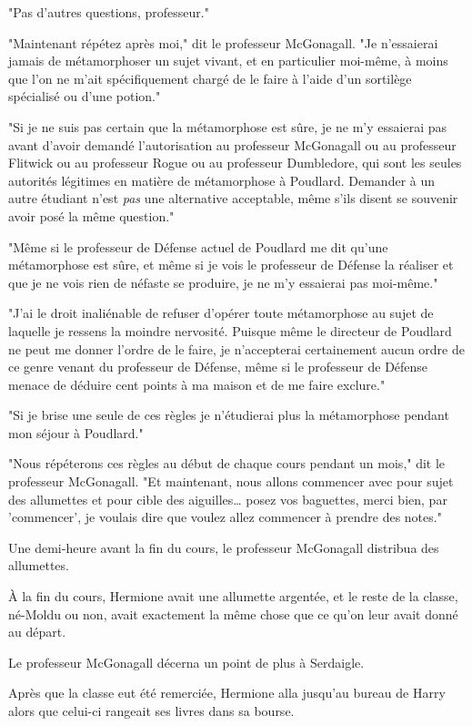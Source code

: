 "Pas d'autres questions, professeur."

"Maintenant répétez après moi," dit le professeur McGonagall. "Je n'essaierai jamais de métamorphoser un sujet vivant, et en particulier moi-même, à moins que l'on ne m'ait spécifiquement chargé de le faire à l'aide d'un sortilège spécialisé ou d'une potion."

"Si je ne suis pas certain que la métamorphose est sûre, je ne m'y essaierai pas avant d'avoir demandé l'autorisation au professeur McGonagall ou au professeur Flitwick ou au professeur Rogue ou au professeur Dumbledore, qui sont les seules autorités légitimes en matière de métamorphose à Poudlard. Demander à un autre étudiant n'est \emph{pas} une alternative acceptable, même s'ils disent se souvenir avoir posé la même question."

"Même si le professeur de Défense actuel de Poudlard me dit qu'une métamorphose est sûre, et même si je vois le professeur de Défense la réaliser et que je ne vois rien de néfaste se produire, je ne m'y essaierai pas moi-même."

"J'ai le droit inaliénable de refuser d'opérer toute métamorphose au sujet de laquelle je ressens la moindre nervosité. Puisque même le directeur de Poudlard ne peut me donner l'ordre de le faire, je n'accepterai certainement aucun ordre de ce genre venant du professeur de Défense, même si le professeur de Défense menace de déduire cent points à ma maison et de me faire exclure."

"Si je brise une seule de ces règles je n'étudierai plus la métamorphose pendant mon séjour à Poudlard."

"Nous répéterons ces règles au début de chaque cours pendant un mois," dit le professeur McGonagall. "Et maintenant, nous allons commencer avec pour sujet des allumettes et pour cible des aiguilles… posez vos baguettes, merci bien, par 'commencer', je voulais dire que voulez allez commencer à prendre des notes."

Une demi-heure avant la fin du cours, le professeur McGonagall distribua des allumettes.

À la fin du cours, Hermione avait une allumette argentée, et le reste de la classe, né-Moldu ou non, avait exactement la même chose que ce qu'on leur avait donné au départ.

Le professeur McGonagall décerna un point de plus à Serdaigle.

\later

Après que la classe eut été remerciée, Hermione alla jusqu'au bureau de Harry alors que celui-ci rangeait ses livres dans sa bourse.


